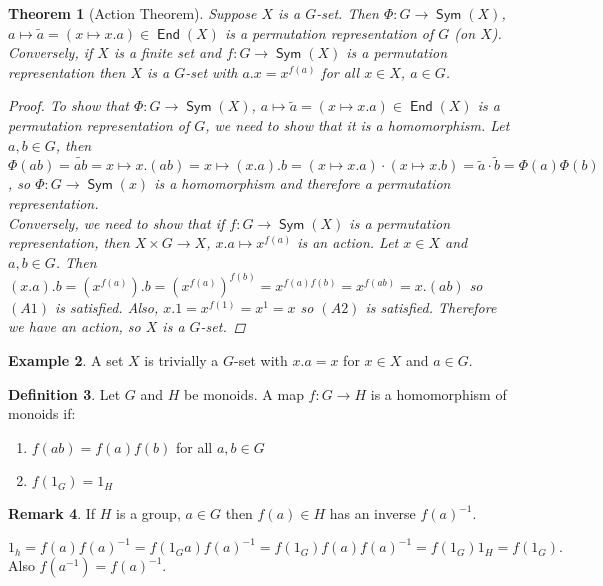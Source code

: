 \documentclass[12pt]{amsart}
\newtheorem{theorem}{Theorem}[section]
\theoremstyle{definition}
\newtheorem{example}[theorem]{Example}
\newtheorem{definition}[theorem]{Definition}
\newtheorem{remark}[theorem]{Remark}
\DeclareMathOperator{\End}{\mathsf{End}}
\DeclareMathOperator{\Sym}{\mathsf{Sym}}
\begin{document}
\begin{theorem}[Action Theorem]
Suppose $X$ is a $G$-set.  Then $\Phi:G\rightarrow \Sym(X)$, $a\mapsto\tilde{a}=(x\mapsto x.a)\in \End(X)$ is a permutation representation of $G$ (on $X$).  Conversely, if $X$ is a finite set and $f:G\rightarrow \Sym(X)$ is a permutation representation then $X$ is a $G$-set with $a.x=x^{f(a)}$ for all $x\in X$, $a\in G$.

\begin{proof}
To show that $\Phi:G\rightarrow \Sym(X)$, $a\mapsto\tilde{a}=(x\mapsto x.a)\in \End(X)$ is a permutation representation of $G$, we need to show that it is a homomorphism.  Let $a, b\in G$, then $\Phi(ab)=\widetilde{ab}=x\mapsto x.(ab)=x\mapsto(x.a).b=(x\mapsto x.a)\cdot(x\mapsto x.b)=\tilde{a}\cdot\tilde{b}=\Phi(a)\Phi(b)$, so $\Phi:G\rightarrow \Sym(x)$ is a homomorphism and therefore a permutation representation.\\
Conversely, we need to show that if $f:G\rightarrow \Sym(X)$ is a permutation representation, then $X\times G\rightarrow X$, $x.a\mapsto x^{f(a)}$ is an action.  Let $x\in X$ and $a, b\in G$.  Then $(x.a).b=(x^{f(a)}).b=(x^{f(a)})^{f(b)}=x^{f(a)f(b)}=x^{f(ab)}=x.(ab)$ so $(A1)$ is satisfied.  Also, $x.1=x^{f(1)}=x^1=x$ so $(A2)$ is satisfied.  Therefore we have an action, so $X$ is a $G$-set.
\end{proof}
\end{theorem}

\begin{example}
A set $X$ is trivially a $G$-set with $x.a=x$ for $x\in X$ and $a\in G$.
\end{example}

\begin{definition}
Let $G$ and $H$ be monoids. A map $f: G \rightarrow H$ is a homomorphism of monoids if:
\begin{enumerate}
\item $f(ab) = f(a)f(b)$ for all $a, b \in G$
\item $f(1_{G}) = 1_{H}$
\end{enumerate}
\end{definition}

\begin{remark}
If $H$ is a group, $a \in G$ then $f(a) \in H$ has an inverse $f(a)^{-1}$.

$1_{h} = f(a)f(a)^{-1} = f( 1_{G} a )f(a)^{-1} = f(1_{G})f(a)f(a)^{-1} = f(1_{G}) 1_{H} = f(1_{G}).$
Also $f(a^{-1}) = f(a)^{-1}$.
\end{remark}
\end{document}
